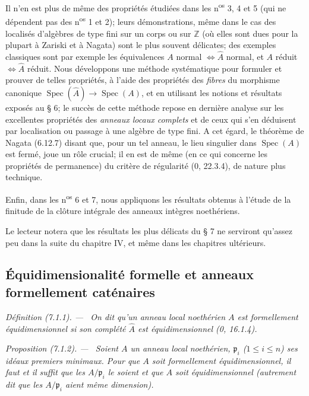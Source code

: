 \documentclass[10pt,oneside]{book}
\newcommand{\oldpage}[2][]{%
  \setcounter{footnote}{0}%
  \marginpar{\scriptsize\textbf{#1}~|~#2}\ignorespaces}
\newenvironment{definition}[1][]{%
  \par\medskip\noindent\itshape Définition (#1). ---\ }{\par}
\newenvironment{proposition}[1][]{%
  \par\medskip\noindent\itshape Proposition (#1). ---\ }{\par}
\begin{document}
Il n'en est plus de même des propriétés étudiées dans les
n\textsuperscript{os} 3, 4 et 5 (qui ne dépendent pas des
n\textsuperscript{os} 1 et 2); leurs démonstrations, même dans le cas des
localisés d'algèbres de type fini sur un corps ou sur $\mathbb Z$ (où elles
sont dues pour la plupart à Zariski et à Nagata) sont le plus souvent
délicates; des exemples classiques sont par exemple les équivalences
$A$ normal $\Longleftrightarrow \widehat A$ normal, et $A$ réduit
$\Longleftrightarrow \widehat A$ réduit. Nous développons une méthode
systématique pour formuler et prouver de telles propriétés, à l'aide des
propriétés des \emph{fibres} du morphisme canonique
$\operatorname{Spec}(\widehat A)\to\operatorname{Spec}(A)$, et en utilisant
les notions et résultats exposés au § 6; le succès de cette méthode repose en
dernière analyse sur les excellentes propriétés des \emph{anneaux locaux
complets} et
de ceux qui s'en déduisent par localisation ou passage à une algèbre de type
fini. A cet égard, le théorème de Nagata (6.12.7) disant que, pour un tel
anneau, le lieu singulier dans $\operatorname{Spec}(A)$ est fermé, joue un rôle
crucial; il en est de même (en ce qui concerne les propriétés de permanence)
du critère de régularité (0, 22.3.4), de nature plus technique.

Enfin, dans les n\textsuperscript{os} 6 et 7, nous appliquons les résultats
obtenus à l'étude de
la finitude de la clôture intégrale des anneaux intègres noethériens.

Le lecteur notera que les résultats les plus délicats du § 7 ne serviront
qu'assez peu dans la suite du chapitre IV, et même dans les chapitres
ultérieurs.

\subsection{Équidimensionalité formelle et anneaux formellement caténaires}
\label{subsection:IV.7.1-fr}

\oldpage[IV-2]{183}

\begin{definition}[7.1.1]
\label{IV.2.s7.1.1-fr}
On dit qu'un anneau local noethérien $A$ est \emph{formellement
équidimensionnel} si son complété $\widehat A$ est équidimensionnel (0,
16.1.4).
\end{definition}

\begin{proposition}[7.1.2]
\label{IV.2.s7.1.2-fr}
Soient $A$ un anneau local noethérien, $\mathfrak p_i$ ($1\leqslant i\leqslant
n$) ses idéaux premiers minimaux. Pour que $A$ soit formellement
équidimensionnel, il faut et il suffit que les $A/\mathfrak p_i$ le soient et
que $A$ soit équidimensionnel (autrement dit que les $A/\mathfrak p_i$ aient
même dimension).
\end{proposition}
\end{document}
